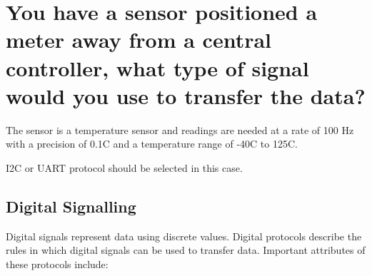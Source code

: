 \documentclass[main.tex]{subfiles}
\begin{document}
\section{You have a sensor positioned a meter away from a central controller, what type of signal would you use to transfer the data?}
The sensor is a temperature sensor and readings are needed at a rate of 100 Hz with a precision of 0.1C and a temperature range of -40C to 125C.

\spoilerline

\noindent I2C or UART protocol should be selected in this case. 

\subsection{Digital Signalling}
Digital signals represent data using discrete values. Digital protocols describe the rules in which digital signals can be used to transfer data. Important attributes of these protocols include:
\end{document}
